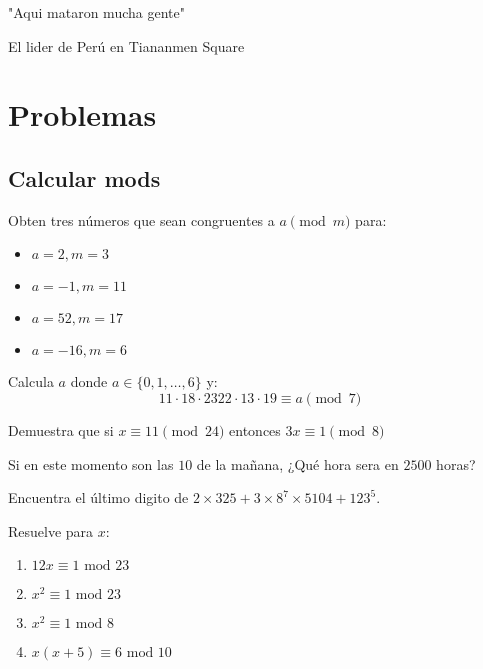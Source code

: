 \documentclass[11pt]{scrartcl}
\newcommand{\thmdifficulty}{0}
\newcommand{\problemdiff}[1]{\renewcommand{\thmdifficulty}{#1}}
\begin{document}
\newpage
\epigraph{"Aqui mataron mucha gente"
}{El lider de Per\'u en Tiananmen Square}
\section{Problemas}
\subsection{Calcular mods}
\problemdiff{0}
\begin{problema}
Obten tres n\'umeros que sean congruentes a $a \pmod m$ para:
\begin{itemize}
\item $a=2, m=3$
\item $a=-1, m=11$
\item $a=52, m=17$
\item $a=-16, m=6$
\end{itemize}
\end{problema}

\problemdiff{0}
\begin{problema}
Calcula $a$ donde $a \in \{0,1,\ldots, 6\}$ y: 
\[11 \cdot 18 \cdot 2322 \cdot 13 \cdot 19 \equiv a \pmod 7\]
\end{problema}

\problemdiff{0}
\begin{problema}
Demuestra que si $x \equiv 11 \pmod{24}$ entonces $3x \equiv 1 \pmod 8$
\end{problema}

 \problemdiff{0}
\begin{problema}
Si en este momento son las $10$ de la mañana, ¿Qu\'e hora sera en $2500$ horas?
\end{problema}

\problemdiff{0}
\begin{problema}
Encuentra el \'ultimo digito de $2\times 325 + 3\times 8^7 \times 5104+ 123^5$.
\end{problema}

\problemdiff{0}
\begin{problema}
Resuelve para $x$:
\begin{enumerate}
    \item $12x\equiv 1 \text{ mod } 23$
    \item $x^2\equiv 1 \text{ mod } 23$
    \item $x^2 \equiv 1 \text{ mod } 8$
    \item $x(x+5) \equiv 6 \text{ mod } 10$
\end{enumerate}
\end{problema}
\end{document}
